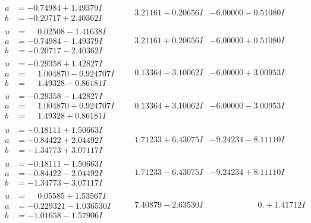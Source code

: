 \documentclass[1p]{elsarticle_modified}
\theoremstyle{definition}
\begin{document}
$$\begin{array}{c|c|c}
\begin{aligned}
a &= -0.74984 + 1.49379 I \\
b &= -0.20717 + 2.40362 I\end{aligned}
 & \phantom{-}3.21161 - 0.20656 I & -6.00000 - 0.51080 I \\ \hline\begin{aligned}
u &= \phantom{-}0.02508 - 1.41638 I \\
a &= -0.74984 - 1.49379 I \\
b &= -0.20717 - 2.40362 I\end{aligned}
 & \phantom{-}3.21161 + 0.20656 I & -6.00000 + 0.51080 I \\ \hline\begin{aligned}
u &= -0.29358 + 1.42827 I \\
a &= \phantom{-}1.004870 - 0.924707 I \\
b &= \phantom{-}1.49328 - 0.86181 I\end{aligned}
 & \phantom{-}0.13364 - 3.10062 I & -6.00000 + 3.00953 I \\ \hline\begin{aligned}
u &= -0.29358 - 1.42827 I \\
a &= \phantom{-}1.004870 + 0.924707 I \\
b &= \phantom{-}1.49328 + 0.86181 I\end{aligned}
 & \phantom{-}0.13364 + 3.10062 I & -6.00000 - 3.00953 I \\ \hline\begin{aligned}
u &= -0.18111 + 1.50663 I \\
a &= -0.84422 + 2.04492 I \\
b &= -1.34773 + 3.07117 I\end{aligned}
 & \phantom{-}1.71233 + 6.43075 I & -9.24234 - 8.11110 I \\ \hline\begin{aligned}
u &= -0.18111 - 1.50663 I \\
a &= -0.84422 - 2.04492 I \\
b &= -1.34773 - 3.07117 I\end{aligned}
 & \phantom{-}1.71233 - 6.43075 I & -9.24234 + 8.11110 I \\ \hline\begin{aligned}
u &= \phantom{-}0.05585 + 1.53567 I \\
a &= -0.229321 - 1.036530 I \\
b &= -1.01658 - 1.57906 I\end{aligned}
 & \phantom{-}7.40879 - 2.63530 I & \phantom{-0.000000 -}0. + 1.41712 I \\ \hline\begin{aligned}

\end{aligned}
\end{array}$$
\end{document}

